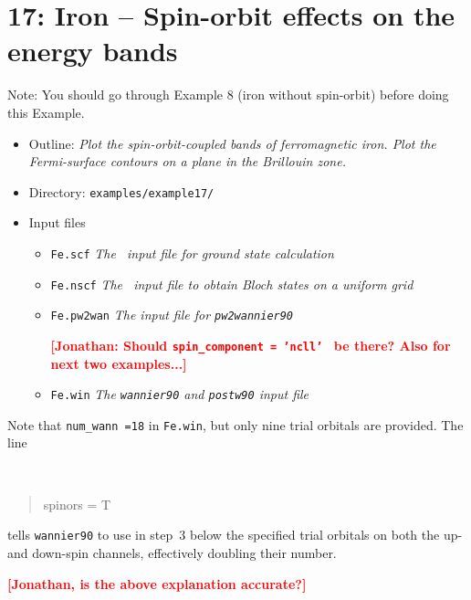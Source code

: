 \documentclass[a4paper,11pt,twoside]{article}
\def\tent#1{\textcolor{red}{#1}}     %
\begin{document}

\cleardoublepage


\section*{17: Iron -- Spin-orbit effects on the energy bands}

Note: You should go through Example 8 (iron without spin-orbit) before
doing this Example.
\begin{itemize}
\item{Outline: \it{Plot the spin-orbit-coupled bands of ferromagnetic
      iron.  Plot the Fermi-surface contours on a plane in the
      Brillouin zone.}}
\item{Directory: {\tt examples/example17/}}
\item{Input files}
\begin{itemize}
\item{ {\tt Fe.scf} {\it The \pwscf\ input file for ground state
    calculation}}
\item{ {\tt Fe.nscf}  {\it The \pwscf\ input file to obtain Bloch
    states on a uniform grid}} 
\item{ {\tt Fe.pw2wan}  {\it The input file for {\tt pw2wannier90}}}

\tent{{\bf [Jonathan: Should {\tt spin\_component = 'ncll'
} be there? Also for next two examples...]}}

\item{ {\tt Fe.win}  {\it The {\tt wannier90} and {\tt postw90} input file}}
\end{itemize}
\end{itemize}

Note that {\tt num\_wann =18} in {\tt Fe.win}, but only nine trial
orbitals are provided. The line
  {\tt
\begin{quote}
spinors = T
\end{quote}
}tells {\tt wannier90} to use in step~3 below the specified trial
orbitals on both the up- and down-spin channels, effectively doubling
their number.

\tent{\bf [Jonathan, is the above explanation accurate?]}
\end{document}
